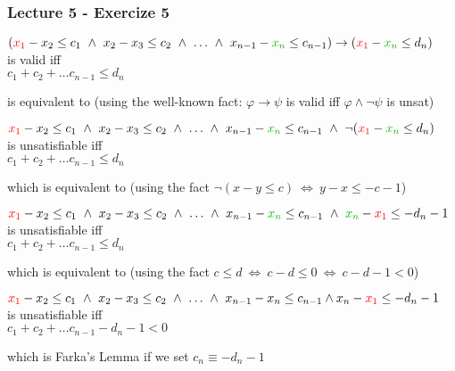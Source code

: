 \begin{frame}
  \frametitle{Lecture 5 - Exercize 5}

  \scriptsize

  \begin{center}
  $(\colone{x_1} - x_2 \leq c_1\ \wedge\ x_2 - x_3 \leq c_2\ \wedge\ \ldots\ \wedge\ x_{n-1} - \coltwo{x_n} \leq c_{n-1}) \rightarrow (\colone{x_1} - \coltwo{x_n} \leq d_n)$ \\
  is valid iff \\
  $c_1 + c_2 + \ldots c_{n-1} \leq d_n$
  \end{center}

  \vfill
  is equivalent to (using the well-known fact: $\varphi \rightarrow \psi$ is valid iff $\varphi \wedge \neg \psi$ is unsat)
  \vfill

  \begin{center}
  $\colone{x_1} - x_2 \leq c_1\ \wedge\ x_2 - x_3 \leq c_2\ \wedge\ \ldots\ \wedge\ x_{n-1} - \coltwo{x_n} \leq c_{n-1}\ \wedge\ \neg(\colone{x_1} - \coltwo{x_n} \leq d_n)$ \\
  is unsatisfiable iff \\
  $c_1 + c_2 + \ldots c_{n-1} \leq d_n$
  \end{center}

  \vfill\pause
  which is equivalent to (using the fact $\neg (x - y \leq c)\ \Longleftrightarrow\ y - x \leq - c - 1$)
  \vfill

  \begin{center}
  $\colone{x_1} - x_2 \leq c_1\ \wedge\ x_2 - x_3 \leq c_2\ \wedge\ \ldots\ \wedge\ x_{n-1} - \coltwo{x_n} \leq c_{n-1}\ \wedge\ \coltwo{x_n} - \colone{x_1} \leq - d_n - 1$ \\
  is unsatisfiable iff \\
  $c_1 + c_2 + \ldots c_{n-1} \leq d_n$
  \end{center}

  \vfill\pause
  which is equivalent to (using the fact $c \leq d\ \Longleftrightarrow\ c - d \leq 0\ \Longleftrightarrow\ c - d - 1 < 0$)
  \vfill

  \begin{center}
  $\textcolor{red}{x_1} - x_2 \leq c_1\ \wedge\ x_2 - x_3 \leq c_2\ \wedge\ \ldots\ \wedge\ x_{n-1} - x_n \leq c_{n-1} \wedge x_n - \textcolor{red}{x_1} \leq - d_n - 1$ \\
  is unsatisfiable iff \\
  $c_1 + c_2 + \ldots c_{n-1} - d_n - 1 < 0$
  \end{center}

  \vfill
  which is Farka's Lemma if we set $c_n \equiv - d_n - 1$

\end{frame}
